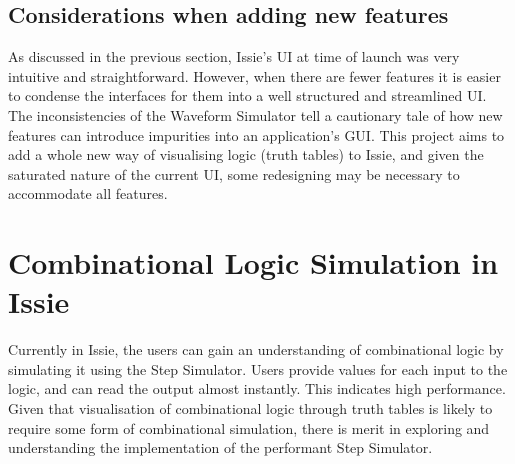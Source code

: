 \subsection{Considerations when adding new features}
As discussed in the previous section, Issie's UI at time of launch was very intuitive and straightforward. However, when there are fewer features it is easier to condense the interfaces for them into a well structured and streamlined UI. The inconsistencies of the Waveform Simulator tell a cautionary tale of how new features can introduce impurities into an application's GUI. This project aims to add a whole new way of visualising logic (truth tables) to Issie, and given the saturated nature of the current UI, some redesigning may be necessary to accommodate all features.

\section{Combinational Logic Simulation in Issie} \label{sec:simulationbackground}
Currently in Issie, the users can gain an understanding of combinational logic by simulating it using the Step Simulator. Users provide values for each input to the logic, and can read the output almost instantly. This indicates high performance. Given that visualisation of combinational logic through truth tables is likely to require some form of combinational simulation, there is merit in exploring and understanding the implementation of the performant Step Simulator.

